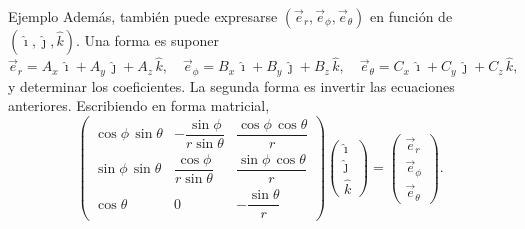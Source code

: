 \documentclass[../apunte_mecanica_clasica.tex]{subfiles}%
\begin{document}
\begin{apuntebloque}{Ejemplo}
Además, también puede expresarse $(\vec{e}_r,\vec{e}_\phi,\vec{e}_\theta)$ en función de $(\hat{\imath},\hat{\jmath},\hat{k})$. Una forma es suponer
\begin{equation*}
\vec{e}_r = A_x\,\hat{\imath} + A_y\,\hat{\jmath} + A_z\,\hat{k},\quad
\vec{e}_\phi = B_x\,\hat{\imath} + B_y\,\hat{\jmath} + B_z\,\hat{k},\quad
\vec{e}_\theta = C_x\,\hat{\imath} + C_y\,\hat{\jmath} + C_z\,\hat{k},
\end{equation*}
y determinar los coeficientes. La segunda forma es invertir las ecuaciones anteriores. Escribiendo en forma matricial,
\begin{equation*}
\begin{pmatrix}
\cos\phi\,\sin\theta & -\dfrac{\sin\phi}{r\sin\theta} & \dfrac{\cos\phi\,\cos\theta}{r}\\[6pt]
\sin\phi\,\sin\theta & \dfrac{\cos\phi}{r\sin\theta} & \dfrac{\sin\phi\,\cos\theta}{r}\\[6pt]
\cos\theta & 0 & -\dfrac{\sin\theta}{r}
\end{pmatrix}
\begin{pmatrix}
\hat{\imath}\\[2pt] \hat{\jmath}\\[2pt] \hat{k}
\end{pmatrix}
=
\begin{pmatrix}
\vec{e}_r\\[2pt] \vec{e}_\phi\\[2pt] \vec{e}_\theta
\end{pmatrix}.
\end{equation*}
\end{apuntebloque}
\end{document}

